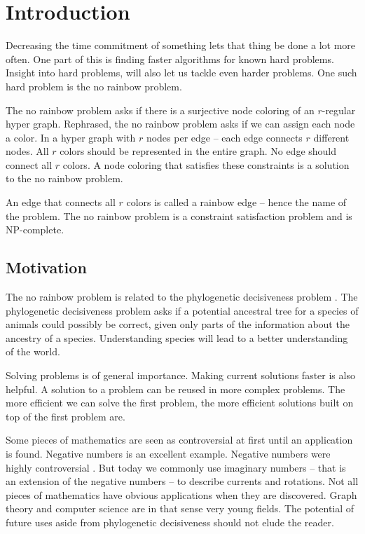 \documentclass[msc,lith,english]{liuthesis}
\author{Edvard Thörnros}
\begin{document}
\chapter{Introduction}
\label{chaIntro}
Decreasing the time commitment of something lets that thing be done a lot more often.
One part of this is finding faster algorithms for known hard problems.
Insight into hard problems, will also let us tackle even harder problems.
One such hard problem is the no rainbow problem.

The no rainbow problem \cite{sourceNoRainbow} asks if there is a surjective node coloring of an $r$-regular hyper graph.
Rephrased, the no rainbow problem asks if we can assign each node a color.
In a hyper graph with $r$ nodes per edge -- each edge connects $r$ different nodes.
All $r$ colors should be represented in the entire graph.
No edge should connect all $r$ colors.
A node coloring that satisfies these constraints is a solution to the no rainbow problem.

An edge that connects all $r$ colors is called a rainbow edge -- hence the name of the problem.
The no rainbow problem is a constraint satisfaction problem and is NP-complete.

\section{Motivation}
The no rainbow problem is related to the phylogenetic decisiveness problem \cite{sourceNoRainbow, sourcePhylogeneticDecisiveness}. The
phylogenetic decisiveness problem asks if a potential ancestral tree for a
species of animals could possibly be correct, given only parts of the
information about the ancestry of a species.
Understanding species will lead to a better understanding of the world.  

Solving problems is of general importance. Making current solutions faster is also helpful.
A solution to a problem can be reused in more complex problems. The more
efficient we can solve the first problem, the more efficient solutions built on
top of the first problem are. 

Some pieces of mathematics are seen as controversial at first until an application is found.
Negative numbers is an excellent example. Negative numbers were highly
controversial \cite{sourceNeg}. But today we commonly use imaginary numbers -- that is an extension of the negative numbers -- to
describe currents and rotations. Not all pieces of mathematics have obvious
applications when they are discovered. Graph theory and computer science are in
that sense very young fields.
The potential of future uses aside from phylogenetic decisiveness should not elude the reader.
\end{document}
